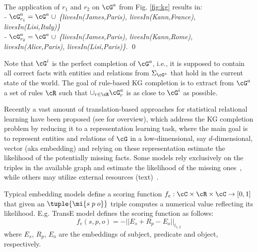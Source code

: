 \begin{example}
The application of $r_1$ and $r_2$ on $\cG^a$ from Fig. \ref{fig:kg} results in:\\
\textit{ - $\cG^a_{r_1} = \cG^a\;\cup$ \{livesIn(James,Paris), livesIn(Kann,France), livesIn(Lisi,Italy)\}}\\
\textit{ - $\cG^a_{r_2} = \cG^a\;\cup$ \{livesIn(James,Paris), livesIn(Kann,Rome), livesIn(Alice,Paris), livesIn(Lisi,Paris)\}}. \qed
\end{example}

Note that $\cG^i$ is the perfect completion of $\cG^a$, i.e., it is supposed to contain all
correct facts with entities and relations from $\Sigma_{\cG^a}$ that hold
in the current state of the world. The goal of rule-based KG completion is to extract from $\cG^a$ a set of rules $\cR$ such that $\cup_{r\in \cR}\cG^a_{r}$ is as close to $ \cG^i$ as possible.

 Recently a vast amount of translation-based approaches for statistical relational learning have been proposed  (see \cite{} for overview), which address the KG completion problem by reducing it to a representation learning task, where the main goal is to represent entities and relations of $\cG$ in a
low-dimensional, say $d$-dimensional, vector (aka embedding) and relying on these representation estimate the likelihood of the potentially missing facts. 
Some models rely exclusively on the triples in the available graph and estimate the likelihood of the missing ones~\cite{Bordes:NIPS2013,DBLP:conf/aaai/NickelRP16}, while others may utilize external resources (\eg text)~\cite{DBLP:conf/aaai/0005HMZ17}. 

Typical embedding models define a scoring function $f_e: \cC \times \cR \times \cC \rightarrow [0,1]$ that given an $\tuple{\mi{s\;p\;o}}$ triple computes a numerical value reflecting its likelihood. %
E.g. TransE \cite{Bordes:2013:TEM:2999792.2999923} model defines the scoring function as follows:
\[f_e{(s,p,o)} = -||E_s + R_p - E_o||_{l_{1,2}}\]
where $E_s$, $R_p$, $E_o$ are the embeddings of subject, predicate and object, respectively.

